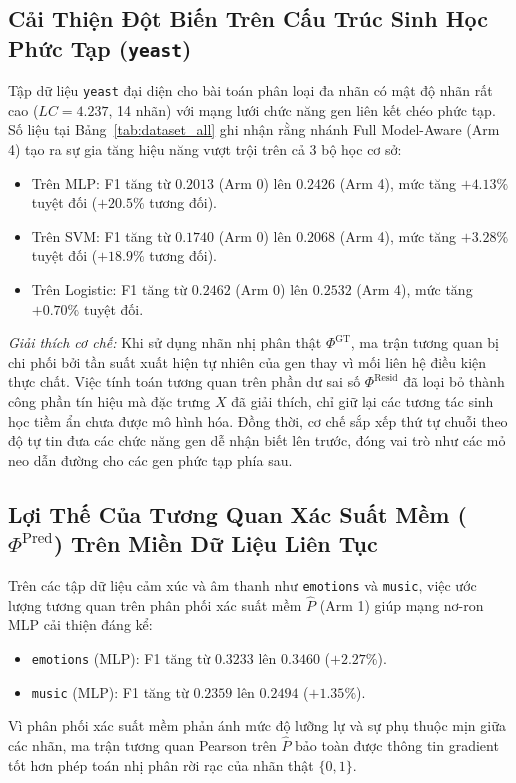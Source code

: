 \documentclass[11pt,a4paper]{article}
\begin{document}
\subsection{Cải Thiện Đột Biến Trên Cấu Trúc Sinh Học Phức Tạp (\texttt{yeast})}
Tập dữ liệu \texttt{yeast} đại diện cho bài toán phân loại đa nhãn có mật độ nhãn rất cao ($LC = 4.237$, 14 nhãn) với mạng lưới chức năng gen liên kết chéo phức tạp. Số liệu tại Bảng~\ref{tab:dataset_all} ghi nhận rằng nhánh Full Model-Aware (Arm 4) tạo ra sự gia tăng hiệu năng vượt trội trên cả 3 bộ học cơ sở:
\begin{itemize}[leftmargin=*]
  \item Trên MLP: F1 tăng từ $0.2013$ (Arm 0) lên $\mathbf{0.2426}$ (Arm 4), mức tăng $+4.13\%$ tuyệt đối ($+20.5\%$ tương đối).
  \item Trên SVM: F1 tăng từ $0.1740$ (Arm 0) lên $\mathbf{0.2068}$ (Arm 4), mức tăng $+3.28\%$ tuyệt đối ($+18.9\%$ tương đối).
  \item Trên Logistic: F1 tăng từ $0.2462$ (Arm 0) lên $\mathbf{0.2532}$ (Arm 4), mức tăng $+0.70\%$ tuyệt đối.
\end{itemize}

\textit{Giải thích cơ chế:} Khi sử dụng nhãn nhị phân thật $\Phi^{\text{GT}}$, ma trận tương quan bị chi phối bởi tần suất xuất hiện tự nhiên của gen thay vì mối liên hệ điều kiện thực chất. Việc tính toán tương quan trên phần dư sai số $\Phi^{\text{Resid}}$ đã loại bỏ thành công phần tín hiệu mà đặc trưng $X$ đã giải thích, chỉ giữ lại các tương tác sinh học tiềm ẩn chưa được mô hình hóa. Đồng thời, cơ chế sắp xếp thứ tự chuỗi theo độ tự tin đưa các chức năng gen dễ nhận biết lên trước, đóng vai trò như các mỏ neo dẫn đường cho các gen phức tạp phía sau.

\subsection{Lợi Thế Của Tương Quan Xác Suất Mềm \texorpdfstring{($\Phi^{\text{Pred}}$)}{(Phi-Pred)} Trên Miền Dữ Liệu Liên Tục}
Trên các tập dữ liệu cảm xúc và âm thanh như \texttt{emotions} và \texttt{music}, việc ước lượng tương quan trên phân phối xác suất mềm $\hat{P}$ (Arm 1) giúp mạng nơ-ron MLP cải thiện đáng kể:
\begin{itemize}[leftmargin=*]
  \item \texttt{emotions} (MLP): F1 tăng từ $0.3233$ lên $\mathbf{0.3460}$ ($+2.27\%$).
  \item \texttt{music} (MLP): F1 tăng từ $0.2359$ lên $\mathbf{0.2494}$ ($+1.35\%$).
\end{itemize}
Vì phân phối xác suất mềm phản ánh mức độ lưỡng lự và sự phụ thuộc mịn giữa các nhãn, ma trận tương quan Pearson trên $\hat{P}$ bảo toàn được thông tin gradient tốt hơn phép toán nhị phân rời rạc của nhãn thật $\{0, 1\}$.
\end{document}
